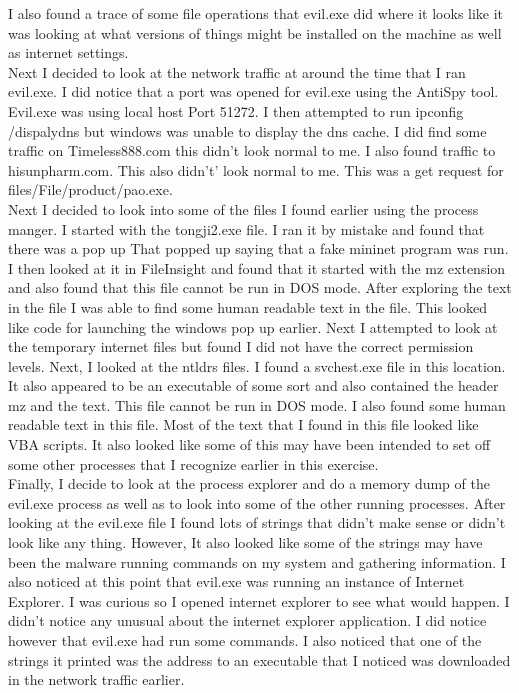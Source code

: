 \documentclass[letterpaper, onecolumn,10pt]{IEEEtran}
\begin{document}
		    I also found a trace of some file operations that evil.exe did where it looks like it was looking at what versions of things might be installed on the machine as well as internet settings.\\
		    
		    Next I decided to look at the network traffic at around the time that I ran evil.exe. I did notice that a port was opened for evil.exe using the AntiSpy tool. Evil.exe was using local host Port 51272. I then attempted to run ipconfig /dispalydns but windows was unable to display the dns cache. I did find some traffic on Timeless888.com this didn't look normal to me. I also found traffic to hisunpharm.com. This also didn't' look normal to me. This was a get request for files/File/product/pao.exe.\\
		    
		    Next I decided to look into some of the files I found earlier using the process manger. I started with the tongji2.exe file. I ran it by mistake and found that there was a pop up That popped up saying that a fake mininet program was run. I then looked at it in FileInsight and found that it started with the mz extension and also found that this file cannot be run in DOS mode. After exploring the text in the file I was able to find some human readable text in the file. This looked like code for launching the windows pop up earlier. Next I attempted to look at the temporary internet files but found I did not have the correct permission levels. Next, I looked at the ntldrs files. I found a svchest.exe file in this location. It also appeared to be an executable of some sort and also contained the header mz and the text. This file cannot be run in DOS mode. I also found some human readable text in this file. Most of the text that I found in this file looked like VBA scripts. It also looked like some of this may have been intended to set off some other processes that I recognize earlier in this exercise.\\
		    
		    Finally, I decide to look at the process explorer and do a memory dump of the evil.exe process as well as to look into some of the other running processes. After looking at the evil.exe file I found lots of strings that didn't make sense or didn't look like any thing. However, It also looked like some of the strings may have been the malware running commands on my system and gathering information. I also noticed at this point that evil.exe was running an instance of Internet Explorer. I was curious so I opened internet explorer to see what would happen. I didn't notice any unusual about the internet explorer application. I did notice however that evil.exe had run some commands. I also noticed that one of the strings it printed was the address to an executable that I noticed was downloaded in the network traffic earlier.\\
		    
\end{document}

